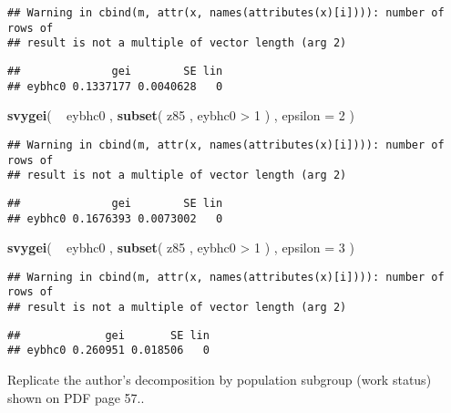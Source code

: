 \documentclass[]{book}
\newenvironment{Shaded}{\begin{snugshade}}{\end{snugshade}}
\newcommand{\KeywordTok}[1]{\textcolor[rgb]{0.13,0.29,0.53}{\textbf{{#1}}}}
\newcommand{\DataTypeTok}[1]{\textcolor[rgb]{0.13,0.29,0.53}{{#1}}}
\newcommand{\DecValTok}[1]{\textcolor[rgb]{0.00,0.00,0.81}{{#1}}}
\newcommand{\StringTok}[1]{\textcolor[rgb]{0.31,0.60,0.02}{{#1}}}
\newcommand{\NormalTok}[1]{{#1}}
\begin{document}
\begin{verbatim}
## Warning in cbind(m, attr(x, names(attributes(x)[i]))): number of rows of
## result is not a multiple of vector length (arg 2)
\end{verbatim}

\begin{verbatim}
##              gei        SE lin
## eybhc0 0.1337177 0.0040628   0
\end{verbatim}

\begin{Shaded}
\begin{Highlighting}[]
\KeywordTok{svygei}\NormalTok{( ~}\StringTok{ }\NormalTok{eybhc0 , }\KeywordTok{subset}\NormalTok{( z85 , eybhc0 >}\StringTok{ }\DecValTok{1} \NormalTok{) , }\DataTypeTok{epsilon =} \DecValTok{2} \NormalTok{)}
\end{Highlighting}
\end{Shaded}

\begin{verbatim}
## Warning in cbind(m, attr(x, names(attributes(x)[i]))): number of rows of
## result is not a multiple of vector length (arg 2)
\end{verbatim}

\begin{verbatim}
##              gei        SE lin
## eybhc0 0.1676393 0.0073002   0
\end{verbatim}

\begin{Shaded}
\begin{Highlighting}[]
\KeywordTok{svygei}\NormalTok{( ~}\StringTok{ }\NormalTok{eybhc0 , }\KeywordTok{subset}\NormalTok{( z85 , eybhc0 >}\StringTok{ }\DecValTok{1} \NormalTok{) , }\DataTypeTok{epsilon =} \DecValTok{3} \NormalTok{)}
\end{Highlighting}
\end{Shaded}

\begin{verbatim}
## Warning in cbind(m, attr(x, names(attributes(x)[i]))): number of rows of
## result is not a multiple of vector length (arg 2)
\end{verbatim}

\begin{verbatim}
##             gei       SE lin
## eybhc0 0.260951 0.018506   0
\end{verbatim}

Replicate the author's decomposition by population subgroup (work
status) shown on PDF page 57..
\end{document}
